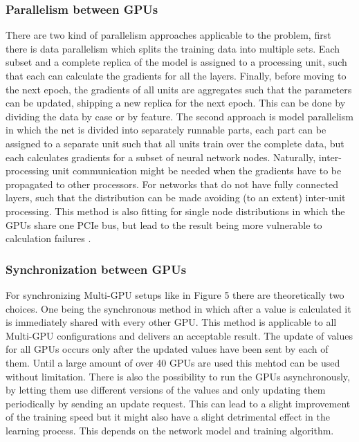 \documentclass[conference]{IEEEtran}
\begin{document}
\subsubsection{Parallelism between GPUs}
There are two kind of parallelism approaches applicable to the problem, first there is data parallelism which splits the training data into multiple sets. Each subset and a complete replica of the model is assigned to a processing unit, such that each can calculate the gradients for all the layers. Finally, before moving to the next epoch, the gradients of all units are aggregates such that the parameters can be updated, shipping a new replica for the next epoch. This can be done by dividing the data by case or by feature. The second approach is model parallelism in which the net is divided into separately runnable parts, each part can be assigned to a separate unit such that all units train over the complete data, but each calculates gradients for a subset of neural network nodes. Naturally, inter-processing unit communication might be needed when the gradients have to be propagated to other processors. For networks that do not have fully connected layers, such that the distribution can be made avoiding (to an extent) inter-unit processing. This method is also fitting for single node distributions in which the GPUs share one PCIe bus, but lead to the result being more vulnerable to calculation failures \cite{sastre2017scalability}.

\subsubsection{Synchronization between GPUs}
For synchronizing Multi-GPU setups like in Figure 5 there are theoretically two choices. One being the synchronous method in which after a value is calculated it is immediately shared with every other GPU. This method is applicable to all Multi-GPU configurations and delivers an acceptable result\cite{wang2016deep}. The update of values for all GPUs occurs only after the updated values have been sent by each of them. Until a large amount of over 40 GPUs are used this mehtod can be used without limitation\cite{sastre2017scalability}. 
There is also the possibility to run the GPUs asynchronously, by letting them use different versions of the values and only updating them periodically by sending an update request. This can lead to a slight improvement of the training speed but it might also have a slight detrimental effect in the learning process\cite{wang2016deep}. This depends on the network model and training algorithm. 
\end{document}
